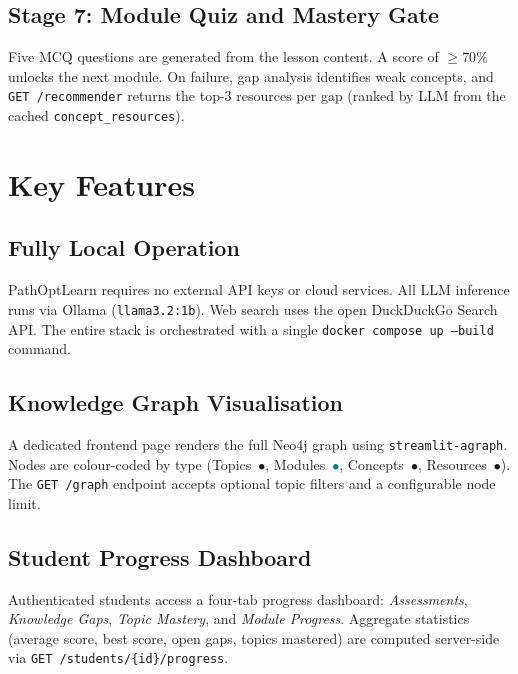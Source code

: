 \documentclass[12pt,a4paper]{article}
\begin{document}
\subsection{Stage 7: Module Quiz and Mastery Gate}

Five MCQ questions are generated from the lesson content. A score of
$\geq 70\%$ unlocks the next module. On failure, gap analysis identifies
weak concepts, and \texttt{GET /recommender} returns the top-3 resources
per gap (ranked by LLM from the cached \texttt{concept\_resources}).

\section{Key Features}

\subsection{Fully Local Operation}

PathOptLearn requires no external API keys or cloud services. All LLM
inference runs via Ollama (\texttt{llama3.2:1b}). Web search uses the
open DuckDuckGo Search API. The entire stack is orchestrated with a single
\texttt{docker compose up --build} command.

\subsection{Knowledge Graph Visualisation}

A dedicated frontend page renders the full Neo4j graph using
\texttt{streamlit-agraph}. Nodes are colour-coded by type
(Topics~\textcolor{red!70}{$\bullet$},
Modules~\textcolor{teal}{$\bullet$},
Concepts~\textcolor{orange!80!black}{$\bullet$},
Resources~\textcolor{green!60!black}{$\bullet$}).
The \texttt{GET /graph} endpoint accepts optional topic filters and
a configurable node limit.

\subsection{Student Progress Dashboard}

Authenticated students access a four-tab progress dashboard:
\emph{Assessments}, \emph{Knowledge Gaps}, \emph{Topic Mastery}, and
\emph{Module Progress}. Aggregate statistics (average score, best score,
open gaps, topics mastered) are computed server-side via
\texttt{GET /students/\{id\}/progress}.
\end{document}
